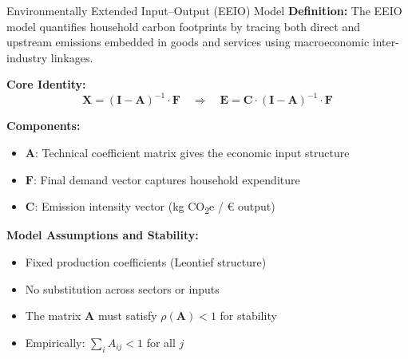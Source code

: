 \documentclass{beamer}
\begin{document}
\begin{frame}{Environmentally Extended Input–Output (EEIO) Model}
\footnotesize
\vspace{-2.5em}
\textbf{Definition:}  
The EEIO model quantifies household carbon footprints by tracing both direct and upstream emissions embedded in goods and services using macroeconomic inter-industry linkages.

\vspace{0.5em}
\textbf{Core Identity:}
\[
\mathbf{X} = (\mathbf{I} - \mathbf{A})^{-1} \cdot \mathbf{F}
\quad
\Rightarrow
\quad
\mathbf{E} = \mathbf{C} \cdot (\mathbf{I} - \mathbf{A})^{-1} \cdot \mathbf{F}
\]

\vspace{0.5em}
\textbf{Components:}
\begin{itemize}
  \item \( \mathbf{A} \): Technical coefficient matrix gives the economic input structure
  \item \( \mathbf{F} \): Final demand vector captures household expenditure
  \item \( \mathbf{C} \): Emission intensity vector (kg CO\textsubscript{2}e / € output)
\end{itemize}

\vspace{0.5em}
\vspace{0.5em}
\textbf{Model Assumptions and Stability:}
\begin{itemize}
  \item Fixed production coefficients (Leontief structure)
  \item No substitution across sectors or inputs
  \item The matrix \( \mathbf{A} \) must satisfy \( \rho(\mathbf{A}) < 1 \) for stability
  \item Empirically: \( \sum_i A_{ij} < 1 \) for all \( j \)
\end{itemize}

\end{frame}
\end{document}
